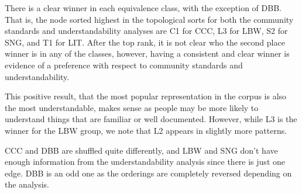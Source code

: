 There is a clear winner in each equivalence class, with the exception of DBB.
That is, the node sorted highest in the topological sorts for both the community standards and understandability analyses are C1 for CCC, L3 for LBW, S2 for SNG, and T1 for LIT.
After the top rank, it is not clear who the second place winner is in any of the classes, however, having a consistent and clear winner is evidence of a preference with respect to community standards and understandability.

This positive result, that the most popular representation in the corpus is also the most understandable, makes sense as people may be more likely to understand things that are familiar or well documented. However, while L3 is the winner for the LBW group, we note that L2 appears in slightly more patterns.

CCC and DBB are shuffled quite differently, and LBW and SNG don't have enough information from the understandability analysis since there is just one edge. DBB is an odd one as the orderings are completely reversed depending on the analysis.


